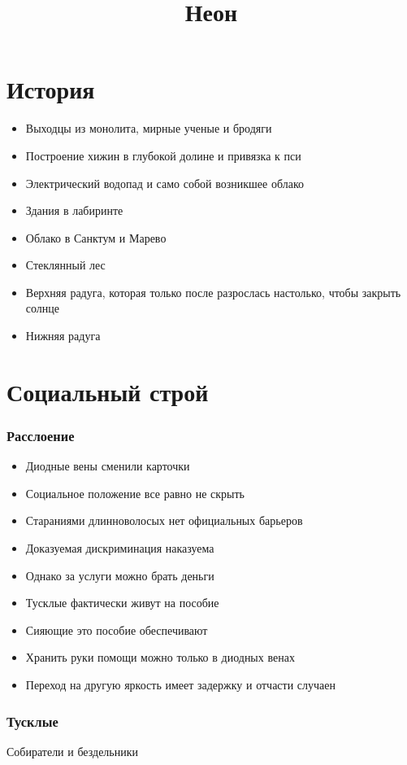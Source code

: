 
\title{Неон}
\maketitle
\tableofcontents

\clearpage
\part{История}
\begin{itemize}
	\item Выходцы из монолита, мирные ученые и бродяги
	\item Построение хижин в глубокой долине и привязка к пси
	\item Электрический водопад и само собой возникшее облако
	\item Здания в лабиринте
	\item Облако в Санктум и Марево
	\item Стеклянный лес
	\item Верхняя радуга, которая только после разрослась настолько, чтобы закрыть солнце
	\item Нижняя радуга
\end{itemize}


\clearpage
\part{Социальный строй}
\section{Расслоение}
\begin{itemize}
	\item Диодные вены сменили карточки
	\item Социальное положение все равно не скрыть
	\item Стараниями длинноволосых нет официальных барьеров
	\item Доказуемая дискриминация наказуема
	\item Однако за услуги можно брать деньги
	\item Тусклые фактически живут на пособие
	\item Сияющие это пособие обеспечивают
	\item Хранить руки помощи можно только в диодных венах
	\item Переход на другую яркость имеет задержку и отчасти случаен
\end{itemize}
\section{Тусклые}
Собиратели и бездельники
